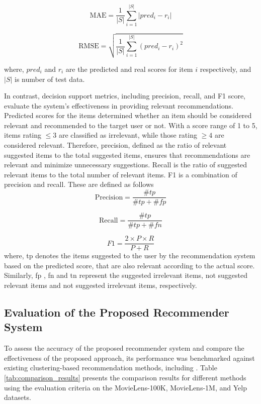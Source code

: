 \documentclass{article}
\begin{document}
\begin{equation}
    \text{MAE} = \frac{1}{|S|} \sum_{i=1}^{|S|} |pred_i - r_i|
\end{equation}


\begin{equation}
    \text{RMSE} = \sqrt{\frac{1}{|S|} \sum_{i=1}^{|S|} (pred_i - r_i)^2}
\end{equation}

where, $pred_i$ and $r_i$ are the predicted and real scores for item $i$ respectively, and $|S|$ is number of test data.

In contrast, decision support metrics, including precision, recall, and F1 score, evaluate the system's effectiveness in providing relevant recommendations. Predicted scores for the items determined whether an item should be considered relevant and recommended to the target user or not. With a score range of 1 to 5, items rating $\leq 3$ are classified as irrelevant, while those rating $\geq 4$ are considered relevant. Therefore, precision, defined as the ratio of relevant suggested items to the total suggested items, ensures that recommendations are relevant and minimize unnecessary suggestions. Recall is the ratio of suggested relevant items to the total number of relevant items. F1 is a combination of precision and recall. These are defined as follows
\[
\text{Precision} = \frac{\#tp}{\#tp + \#fp}
\]

\[
\text{Recall} = \frac{\#tp}{\#tp + \#fn}
\]

\[
F1 = \frac{2 \times P \times R}{P + R}
\]
where, tp denotes the items suggested to the user by the recommendation system based on the predicted score, that are also relevant according to the actual score. Similarly, fp , fn and tn represent the suggested irrelevant items, not suggested relevant items and not suggested irrelevant items, respectively.


\subsection{Evaluation of the Proposed Recommender System}
To assess the accuracy of the proposed recommender system and compare the effectiveness of the proposed approach, its performance was benchmarked against existing clustering-based recommendation methods, including \cite{liji2018improved, kant2017leaderrank, mohammadpour2019efficient, wasid2018clustering}. Table \ref{tab:comparison_results} presents the comparison results for different methods using the evaluation criteria on the MovieLens-100K, MovieLens-1M, and Yelp datasets.
\end{document}
